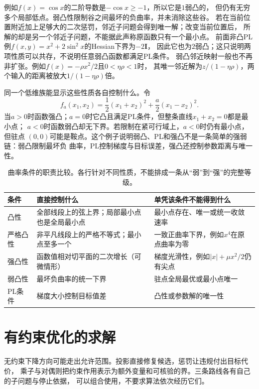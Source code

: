 例如$f(x)=\cos x$的二阶导数是$-\cos x\geq-1$，所以它是$1$弱凸的，
但仍有无穷多个局部低点。弱凸性限制谷之间最坏的负曲率，并未消除这些谷。
若在当前位置附近加上足够大的二次惩罚，邻近子问题会得到唯一解；改变当前位置后，
所解的却是另一个邻近子问题，不能据此声称原函数只有一个最小点。
前面非凸PL例$f(x,y)=x^2+2\sin^2x$的Hessian下界为$-2\bm I$，
因此它也为$2$弱凸；这只说明两项性质可以共存，不说明任意弱凸函数都满足PL条件。
弱凸邻近映射一般也不再非扩张。例如$f(x)=-\rho x^2/2$且$0<\eta\rho<1$时，
其唯一邻近解为$z/(1-\eta\rho)$，两个输入的距离被放大$1/(1-\eta\rho)$倍。

同一个低维族能显示这些性质各自控制什么。令
\[
  f_a(x_1,x_2)=\frac12(x_1+x_2)^2+\frac{a}{2}(x_1-x_2)^2.
\]
当$a>0$时函数强凸；$a=0$时它凸且满足PL条件，但整条直线$x_1+x_2=0$都是最小点；
$a<0$时函数弱凸却无下界。若限制在紧可行域上，$a<0$时仍有最小点，但驻点
$(0,0)$可能是鞍点。这个例子说明弱凸、PL和强凸不是一条简单的强弱链：弱凸限制最坏负
曲率，PL控制梯度与目标误差，强凸还控制参数距离与唯一性。

\begin{table}[htbp]
 \centering\small
 \begin{tabularx}{\linewidth}{@{}lXX@{}}
 \toprule
 条件 & 直接控制什么 & 单凭该条件不能得到什么\\
 \midrule
 凸性 & 全部线段上的弦上界；局部最小点也是全局最小点 & 最小点存在、唯一或统一收敛速率\\
 严格凸性 & 非平凡线段上的严格不等式；最小点至多一个 & 一致正曲率下界，例如$x^4$在原点曲率为零\\
 强凸性 & 函数值相对切平面的二次增长（可微情形） & 梯度光滑性，例如$|x|+\mu x^2/2$仍有尖点\\
 弱凸性 & 最坏负曲率的统一下界 & 驻点全局最优或最小点唯一\\
 PL条件 & 梯度大小控制目标值差 & 凸性或参数解的唯一性\\
 \bottomrule
 \end{tabularx}
 \caption{曲率条件的职责比较。各行针对不同性质，不能排成一条从“弱”到“强”的完整等级。}
 \label{tab:opt-curvature-conditions}
\end{table}

\section{有约束优化的求解}
\label{sec:opt-constraints-duality-certificates}

无约束下降方向可能走出允许范围。投影直接修复候选，惩罚让违规付出目标代价，
乘子与对偶则把约束作用表示为额外变量和可核验的界。三条路线各有自己的子问题与停止依据，
可以组合使用，不要求算法依次经历它们。

